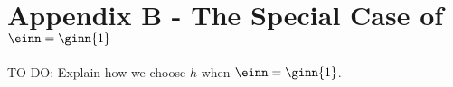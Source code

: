 {\color{red}\section{Appendix B - The Special Case of $\einn = \ginn{1}$}}
\label{sec:special_source_group}
{\color{blue} TO DO: Explain how we choose $h$ when $\einn = \ginn{1}$.} 

